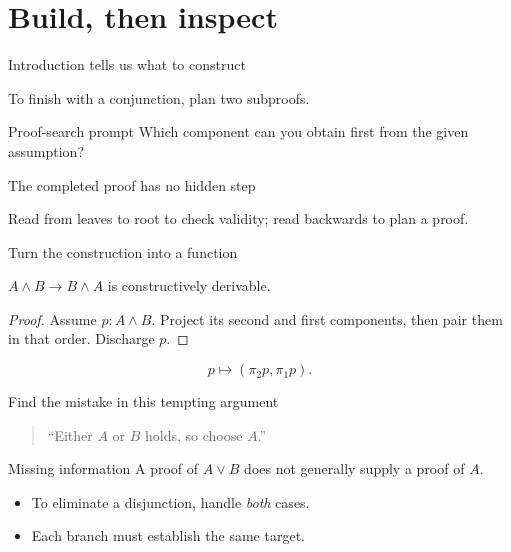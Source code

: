 \documentclass[12pt,aspectratio=43]{beamer}
\begin{document}
\section{Build, then inspect}
\begin{frame}{Introduction tells us what to construct}
\begin{prooftree}
\end{prooftree}
\medskip
To finish with a conjunction, plan two subproofs.
\pause
\begin{alertblock}{Proof-search prompt}
Which component can you obtain first from the given assumption?
\end{alertblock}
\end{frame}
\begin{frame}{The completed proof has no hidden step}
\begin{prooftree}
\end{prooftree}
\smallskip
Read from leaves to root to check validity; read backwards to plan a proof.
\end{frame}
\begin{frame}{Turn the construction into a function}
\begin{theorem}
$A\land B\to B\land A$ is constructively derivable.
\end{theorem}
\begin{proof}
Assume $p:A\land B$. Project its second and first components, then pair them in that order. Discharge $p$.
\end{proof}
\[
 p\longmapsto (\pi_2p,\pi_1p).
\]
\end{frame}
\begin{frame}{Find the mistake in this tempting argument}
\begin{quote}
``Either $A$ or $B$ holds, so choose $A$.''
\end{quote}
\pause
\begin{alertblock}{Missing information}
A proof of $A\lor B$ does not generally supply a proof of $A$.
\end{alertblock}
\begin{itemize}
\item To eliminate a disjunction, handle \emph{both} cases.
\item Each branch must establish the same target.
\end{itemize}
\end{frame}
\end{document}
